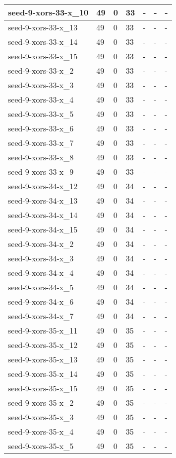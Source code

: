 \begin{scriptsize}
\begin{longtable}{|p{5cm}|l|l|l|l|l|l|}
seed-9-xors-33-x\_10&49&0&33&-&-&- \\ \hline 
seed-9-xors-33-x\_13&49&0&33&-&-&- \\ \hline 
seed-9-xors-33-x\_14&49&0&33&-&-&- \\ \hline 
seed-9-xors-33-x\_15&49&0&33&-&-&- \\ \hline 
seed-9-xors-33-x\_2&49&0&33&-&-&- \\ \hline 
seed-9-xors-33-x\_3&49&0&33&-&-&- \\ \hline 
seed-9-xors-33-x\_4&49&0&33&-&-&- \\ \hline 
seed-9-xors-33-x\_5&49&0&33&-&-&- \\ \hline 
seed-9-xors-33-x\_6&49&0&33&-&-&- \\ \hline 
seed-9-xors-33-x\_7&49&0&33&-&-&- \\ \hline 
seed-9-xors-33-x\_8&49&0&33&-&-&- \\ \hline 
seed-9-xors-33-x\_9&49&0&33&-&-&- \\ \hline 
seed-9-xors-34-x\_12&49&0&34&-&-&- \\ \hline 
seed-9-xors-34-x\_13&49&0&34&-&-&- \\ \hline 
seed-9-xors-34-x\_14&49&0&34&-&-&- \\ \hline 
seed-9-xors-34-x\_15&49&0&34&-&-&- \\ \hline 
seed-9-xors-34-x\_2&49&0&34&-&-&- \\ \hline 
seed-9-xors-34-x\_3&49&0&34&-&-&- \\ \hline 
seed-9-xors-34-x\_4&49&0&34&-&-&- \\ \hline 
seed-9-xors-34-x\_5&49&0&34&-&-&- \\ \hline 
seed-9-xors-34-x\_6&49&0&34&-&-&- \\ \hline 
seed-9-xors-34-x\_7&49&0&34&-&-&- \\ \hline 
seed-9-xors-35-x\_11&49&0&35&-&-&- \\ \hline 
seed-9-xors-35-x\_12&49&0&35&-&-&- \\ \hline 
seed-9-xors-35-x\_13&49&0&35&-&-&- \\ \hline 
seed-9-xors-35-x\_14&49&0&35&-&-&- \\ \hline 
seed-9-xors-35-x\_15&49&0&35&-&-&- \\ \hline 
seed-9-xors-35-x\_2&49&0&35&-&-&- \\ \hline 
seed-9-xors-35-x\_3&49&0&35&-&-&- \\ \hline 
seed-9-xors-35-x\_4&49&0&35&-&-&- \\ \hline 
seed-9-xors-35-x\_5&49&0&35&-&-&- \\ \hline 

\end{longtable}
\end{scriptsize}
